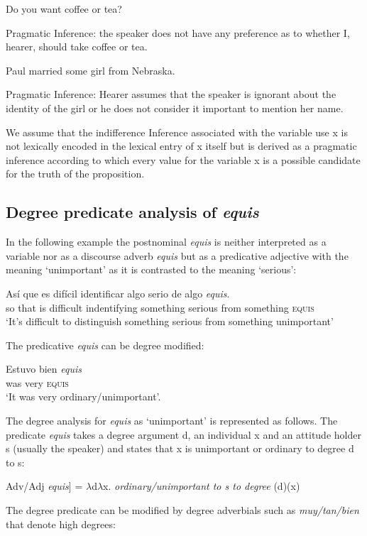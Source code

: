 \documentclass[output=paper
,modfonts
,nonflat]{langsci/langscibook}
\begin{document}
\ea Do you want coffee or tea?
\par
Pragmatic Inference: the speaker does not have any preference as to whether I, hearer, should take coffee or tea.
\z

\ea Paul married some girl from Nebraska. 
\par
Pragmatic Inference: Hearer assumes that the speaker is ignorant about the 	identity of the girl or he does not consider it important to mention her name.
\z

We assume that the indifference Inference associated with the variable use x is not lexically encoded in the lexical entry of x itself but is derived as a pragmatic inference according to which every value for the variable x is a possible candidate for the truth of the proposition.

\subsection{Degree predicate analysis of \textit{equis}}\label{sec:kellert:3.3}
In the following example the postnominal \textit{equis} is neither interpreted as a variable nor as a discourse adverb \textit{equis} but as a predicative adjective with the meaning ‘unimportant’ as it is contrasted to the meaning ‘serious’: 

\ea
\gll Así que es difícil identificar algo serio de algo \textit{equis}.\\
so that is difficult indentifying something serious from something	\textsc{equis}\\
\glt ‘It’s difficult to distinguish something serious from something unimportant’
\z
 
The predicative \textit{equis} can be degree modified:

\ea
\gll Estuvo bien \textit{equis}\\
was very \textsc{equis}\\
\glt `It was very ordinary/unimportant’. 
\z

The degree analysis for \textit{equis} as ‘unimportant’ is represented as follows. The predicate \textit{equis} takes a degree argument d, an individual x and an attitude holder s (usually the speaker) and states that x is unimportant or ordinary to degree d to s:

\ea {[}Adv/Adj \textit{equis}{]} = $\lambda$d$\lambda$x. \textit{ordinary/unimportant to s to degree} (d)(x)
\z

The degree predicate can be modified by degree adverbials such as \textit{muy/tan/bien} that denote high degrees:
\end{document}
